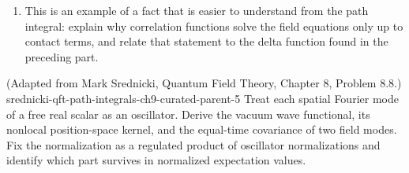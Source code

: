 \begin{enumerate}
\begin{enumerate}
\emph{Hint.}  Use the canonical equal-time commutation relations
\[
 [\phi(x^0,\mathbf x),\phi(x^0,\mathbf y)]=0,
 \qquad
 [\partial_{x^0}\phi(x^0,\mathbf x),\phi(x^0,\mathbf y)]
 =-\ii\delta^d(\mathbf x-\mathbf y).
\]
Do not neglect \(\partial_t\theta(t)=\delta(t)\): the time derivatives act
on the time-ordering symbol.
\item
This is an example of a fact that is easier to understand from the path
integral: explain why correlation functions solve the field equations only
up to contact terms, and relate that statement to the delta function found
in the preceding part.
\end{enumerate}

  {(Adapted from Mark Srednicki, Quantum Field Theory, Chapter 8, Problem 8.8.)}
  {srednicki-qft-path-integrals-ch9-curated-parent-5}
Treat each spatial Fourier mode of a free real scalar as an oscillator.
Derive the vacuum wave functional, its nonlocal position-space kernel, and
the equal-time covariance of two field modes.  Fix the normalization as a
regulated product of oscillator normalizations and identify which part
survives in normalized expectation values.


\end{enumerate}
